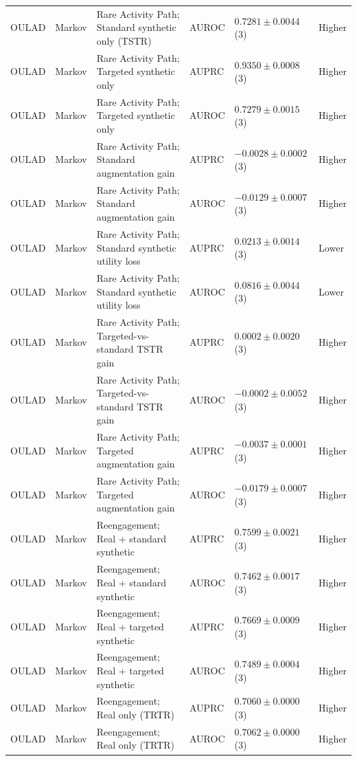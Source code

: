 \begin{longtable}{@{}p{2.25cm}p{2.05cm}p{4.7cm}p{5.0cm}p{2.6cm}p{1.25cm}@{}}
OULAD & Markov & Rare Activity Path; Standard synthetic only (TSTR) & AUROC & $0.7281 \mathbin{\pm} 0.0044$ (3) & Higher \\
OULAD & Markov & Rare Activity Path; Targeted synthetic only & AUPRC & $0.9350 \mathbin{\pm} 0.0008$ (3) & Higher \\
OULAD & Markov & Rare Activity Path; Targeted synthetic only & AUROC & $0.7279 \mathbin{\pm} 0.0015$ (3) & Higher \\
OULAD & Markov & Rare Activity Path; Standard augmentation gain & AUPRC & $-0.0028 \mathbin{\pm} 0.0002$ (3) & Higher \\
OULAD & Markov & Rare Activity Path; Standard augmentation gain & AUROC & $-0.0129 \mathbin{\pm} 0.0007$ (3) & Higher \\
OULAD & Markov & Rare Activity Path; Standard synthetic utility loss & AUPRC & $0.0213 \mathbin{\pm} 0.0014$ (3) & Lower \\
OULAD & Markov & Rare Activity Path; Standard synthetic utility loss & AUROC & $0.0816 \mathbin{\pm} 0.0044$ (3) & Lower \\
OULAD & Markov & Rare Activity Path; Targeted-vs-standard TSTR gain & AUPRC & $0.0002 \mathbin{\pm} 0.0020$ (3) & Higher \\
OULAD & Markov & Rare Activity Path; Targeted-vs-standard TSTR gain & AUROC & $-0.0002 \mathbin{\pm} 0.0052$ (3) & Higher \\
OULAD & Markov & Rare Activity Path; Targeted augmentation gain & AUPRC & $-0.0037 \mathbin{\pm} 0.0001$ (3) & Higher \\
OULAD & Markov & Rare Activity Path; Targeted augmentation gain & AUROC & $-0.0179 \mathbin{\pm} 0.0007$ (3) & Higher \\
OULAD & Markov & Reengagement; Real + standard synthetic & AUPRC & $0.7599 \mathbin{\pm} 0.0021$ (3) & Higher \\
OULAD & Markov & Reengagement; Real + standard synthetic & AUROC & $0.7462 \mathbin{\pm} 0.0017$ (3) & Higher \\
OULAD & Markov & Reengagement; Real + targeted synthetic & AUPRC & $0.7669 \mathbin{\pm} 0.0009$ (3) & Higher \\
OULAD & Markov & Reengagement; Real + targeted synthetic & AUROC & $0.7489 \mathbin{\pm} 0.0004$ (3) & Higher \\
OULAD & Markov & Reengagement; Real only (TRTR) & AUPRC & $0.7060 \mathbin{\pm} 0.0000$ (3) & Higher \\
OULAD & Markov & Reengagement; Real only (TRTR) & AUROC & $0.7062 \mathbin{\pm} 0.0000$ (3) & Higher \\

\end{longtable}
